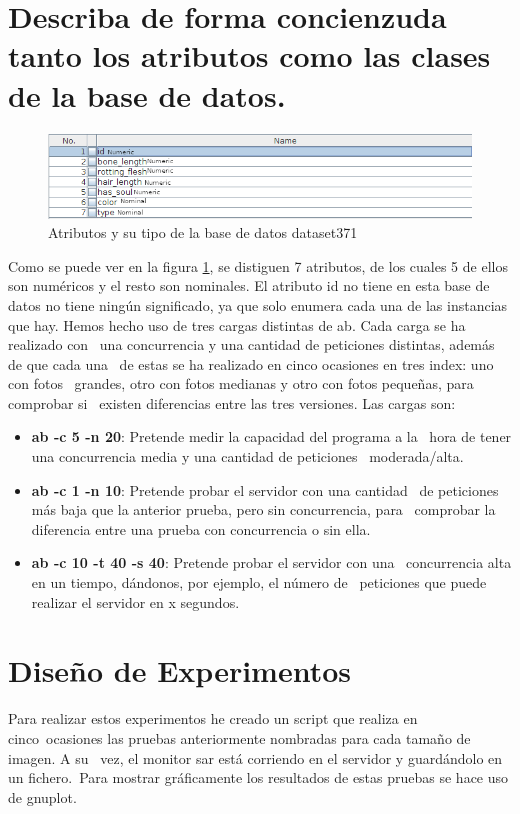 \documentclass[11pt,twoside,a4paper]{book}
\begin{document}
\section{Describa de forma concienzuda tanto los atributos como las clases de la base de datos.}
\begin{figure}[H]
   \includegraphics[width=\textwidth]{ejercicio4_4.png}
	\caption{Atributos y su tipo de la base de datos dataset371}
	\label{Fig9}
\end{figure}
Como se puede ver en la figura \ref{Fig9}, se distiguen 7 atributos, de los cuales
5 de ellos son numéricos y el resto son nominales. El atributo id no tiene en esta
base de datos no tiene ningún significado, ya que solo enumera cada una de las instancias
que hay.
Hemos hecho uso de tres cargas distintas de ab. Cada carga se ha realizado con \
una concurrencia y una cantidad de peticiones distintas, además de que cada una \
de estas se ha realizado en cinco ocasiones en tres index: uno con fotos \
grandes, otro con fotos medianas y otro con fotos pequeñas, para comprobar si \
existen diferencias entre las tres versiones. Las cargas son:
\begin{itemize}
  \item \textbf{ab -c 5 -n 20}: Pretende medir la capacidad  del programa a la \
  hora de tener una concurrencia media y una cantidad de peticiones \
  moderada/alta.
  \item \textbf{ab -c 1 -n 10}: Pretende probar el servidor con una cantidad \
  de peticiones más baja que la anterior prueba, pero sin concurrencia, para \
  comprobar la diferencia entre una prueba con concurrencia o sin ella.
  \item \textbf{ab -c 10 -t 40 -s 40}: Pretende probar el servidor con una \
  concurrencia alta en un tiempo, dándonos, por ejemplo, el número de \
  peticiones que puede realizar el servidor en x segundos.
\end{itemize}

\section{Diseño de Experimentos}
Para realizar estos experimentos he creado un script que realiza en cinco\
ocasiones las pruebas anteriormente nombradas para cada tamaño de imagen. A su \
vez, el monitor sar está corriendo en el servidor y guardándolo en un fichero.\
Para mostrar gráficamente los resultados de estas pruebas se hace uso de gnuplot.
\end{document}
